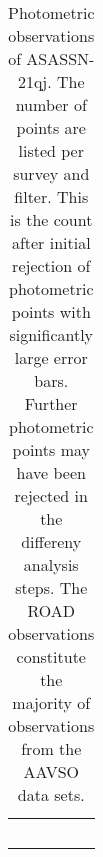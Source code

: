 \documentclass[sn-nature]{sn-jnl}%
\begin{document}
\begin{table}
    \centering
    \caption{Photometric observations of ASASSN-21qj. The number of points are listed per survey and filter. %
    This is the count after initial rejection of photometric points with significantly large error bars.
    Further photometric points may have been rejected in the differeny analysis steps.
    The ROAD observations constitute the majority of observations from the AAVSO data sets.}
    \begin{tabular}{p{}}
    \, \\
    \end{tabular}
% 
\label{tab:photometry}
\end{table}


\end{document}

